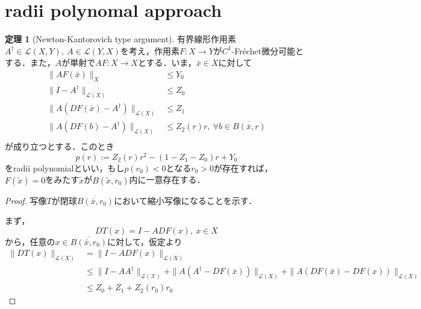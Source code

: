 \documentclass[11pt,a4paper,titlepage]{jsreport}
\theoremstyle{definition}
\newtheorem{thm}{定理}
\begin{document}
\section{radii polynomal approach \cite{github}}
\begin{thm}[Newton-Kantorovich type argument]
  有界線形作用素$A^\dagger \in \mathcal{L}(X,Y),\ A\in \mathcal{L}(Y,X)$を考え，作用素$F:X\rightarrow Y$が$C^1$-Fr\'{e}chet微分可能とする．また，$A$が単射で$AF:X\rightarrow X$とする．いま，$\bar{x} \in X$に対して%
  \begin{align*}
    \|AF(\bar{x})\|_X                             & \leq Y_0                                             \\
    \|I-A^\dagger\|_{\mathcal{L}(X)}              & \leq Z_0                                             \\
    \|A(DF(\bar{x})-A^\dagger)\|_{\mathcal{L}(X)} & \leq Z_1                                             \\
    \|A(DF(b)-A^\dagger)\|_{\mathcal{L}(X)}       & \leq Z_2(r)r,\ \forall b \in \overline{B(\bar{x},r)} \\
  \end{align*}
  が成り立つとする．このとき
  \begin{equation*}
    p(r) := Z_2(r)r^2 - (1-Z_1-Z_0)r+Y_0
  \end{equation*}
  をradii polynomialといい，もし$p(r_0)<0$となる$r_0>0$が存在すれば，$F(\tilde{x})=0$をみたす$\tilde{x}$が$\overline{B(\tilde{x},r_0)}$内に一意存在する．
\end{thm}

\begin{proof}
  写像$T$が閉球$\overline{B(\bar{x},r_0)}$において縮小写像になることを示す．

  まず，
  \begin{equation*}
    DT(x)=I-ADF(x),\ x\in X
  \end{equation*}
  から，任意の$x\in \overline{B(\bar{x},r_0)}$に対して，仮定より
  \begin{align*}
    \|DT(x)\|_{\mathcal{L}(X)} & = \|I-ADF(x)\|_{\mathcal{L}(X)}                                                                                                  \\
                               & \leq \|I-AA^\dagger\|_\mathcal{L(X)} + \|A(A^\dagger-DF(\bar{x}))\|_{\mathcal{L}(X)} + \|A(DF(\bar{x})-DF(x))\|_{\mathcal{L}(X)} \\
                               & \leq Z_0 + Z_1 + Z_2(r_0)r_0
  \end{align*}
\end{proof}
\end{document}

